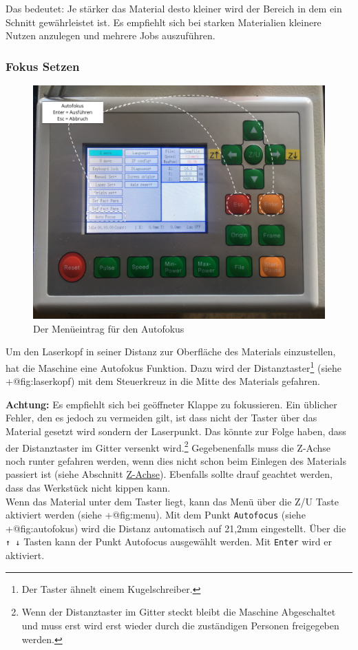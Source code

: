 \documentclass[]{article}
\begin{document}
Das bedeutet: Je stärker das Material desto kleiner wird der Bereich in
dem ein Schnitt gewährleistet ist. Es empfiehlt sich bei starken
Materialien kleinere Nutzen anzulegen und mehrere Jobs auszuführen.

\hypertarget{fokus-setzen}{%
\subsubsection{Fokus Setzen}\label{fokus-setzen}}

\begin{figure}
\hypertarget{fig:autofokus}{%
\centering
\includegraphics{assets/images/laser-autofokus.png}
\caption{Der Menüeintrag für den Autofokus}\label{fig:autofokus}
}
\end{figure}

Um den Laserkopf in seiner Distanz zur Oberfläche des Materials
einzustellen, hat die Maschine eine Autofokus Funktion. Dazu wird der
Distanztaster\footnote{Der Taster ähnelt einem Kugelschreiber.} (siehe
+@fig:laserkopf) mit dem Steuerkreuz in die Mitte des Materials
gefahren.

\textbf{Achtung:} Es empfiehlt sich bei geöffneter Klappe zu
fokussieren. Ein üblicher Fehler, den es jedoch zu vermeiden gilt, ist
dass nicht der Taster über das Material gesetzt wird sondern der
Laserpunkt. Das könnte zur Folge haben, dass der Distanztaster im Gitter
versenkt wird.\footnote{Wenn der Distanztaster im Gitter steckt bleibt
  die Maschine Abgeschaltet und muss erst wird erst wieder durch die
  zuständigen Personen freigegeben werden.} Gegebenenfalls muss die
Z-Achse noch runter gefahren werden, wenn dies nicht schon beim Einlegen
des Materials passiert ist (siehe Abschnitt
\protect\hyperlink{z-achse}{Z-Achse}). Ebenfalls sollte drauf geachtet
werden, dass das Werkstück nicht kippen kann.\\
Wenn das Material unter dem Taster liegt, kann das Menü über die Z/U
Taste aktiviert werden (siehe +@fig:menu). Mit dem Punkt
\texttt{Autofocus} (siehe +@fig:autofokus) wird die Distanz automatisch
auf 21,2mm eingestellt. Über die \texttt{↑\ ↓} Tasten kann der Punkt
Autofocus ausgewählt werden. Mit \texttt{Enter} wird er aktiviert.
\end{document}

